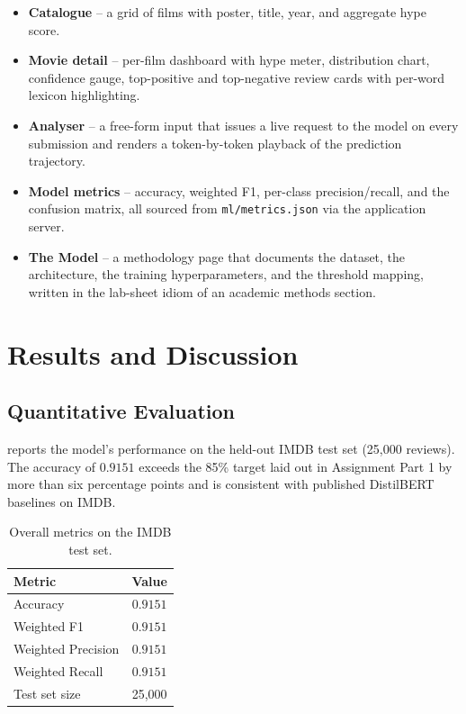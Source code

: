 \documentclass[11pt, a4paper]{article}
\begin{document}
\begin{itemize}[leftmargin=1.4em, itemsep=2pt, topsep=4pt]
  \item \textbf{Catalogue} -- a grid of films with poster, title, year, and aggregate hype score.
  \item \textbf{Movie detail} -- per-film dashboard with hype meter, distribution chart, confidence gauge, top-positive and top-negative review cards with per-word lexicon highlighting.
  \item \textbf{Analyser} -- a free-form input that issues a live request to the model on every submission and renders a token-by-token playback of the prediction trajectory.
  \item \textbf{Model metrics} -- accuracy, weighted F1, per-class precision/recall, and the confusion matrix, all sourced from \texttt{ml/metrics.json} via the application server.
  \item \textbf{The Model} -- a methodology page that documents the dataset, the architecture, the training hyperparameters, and the threshold mapping, written in the lab-sheet idiom of an academic methods section.
\end{itemize}

\section{Results and Discussion}\label{sec:results}

\subsection{Quantitative Evaluation}

 reports the model's performance on the held-out IMDB test set (25{,}000 reviews). The accuracy of $0.9151$ exceeds the 85\% target laid out in Assignment Part 1 by more than six percentage points and is consistent with published DistilBERT baselines on IMDB.

\begin{table}[ht]
\centering
\small
\begin{tabular}{l c}
\toprule
\textbf{Metric} & \textbf{Value} \\
\midrule
Accuracy           & $0.9151$ \\
Weighted F1        & $0.9151$ \\
Weighted Precision & $0.9151$ \\
Weighted Recall    & $0.9151$ \\
Test set size      & 25{,}000 \\
\bottomrule
\end{tabular}
\caption{Overall metrics on the IMDB test set.}
\label{tab:overall}
\end{table}
\end{document}
